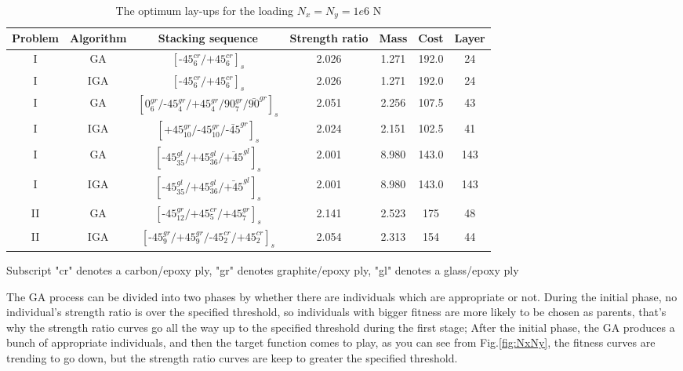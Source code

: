 \documentclass[USenglish]{article}
\begin{document}
\begin{table}
\caption{The optimum lay-ups for the loading $N_x=N_y=1e6$ N}
\begin{tabular}{ccccccc}
	\toprule
	 Problem  &   Algorithm      & Stacking sequence                                    & Strength ratio  & Mass  &  Cost   & Layer    \\ 
	\midrule																								  
	      I   &  GA   &  $[\text{-}45_{6}^{cr}/\text{+}45_{6}^{cr}]_s$                        & 2.026           & 1.271 &  192.0  & 24  \\
	      I   &  IGA   &  $[\text{-}45_{6}^{cr}/\text{+}45_{6}^{cr}]_s$                        & 2.026           & 1.271 &  192.0  & 24  \\
	      I   &  GA    &  $[0_6^{gr}/\text{-}45_{4}^{gr}/\text{+}45_{4}^{gr}/90_{7}^{gr}/\bar{90}^{gr}]_s$     & 2.051           & 2.256 &  107.5  & 43  \\
	      I   &  IGA    &  $[\text{+}45_{10}^{gr}/\text{-}45_{10}^{gr}/\bar{\text{-}45}^{gr}]_s$    & 2.024           & 2.151 &  102.5  & 41  \\
	      I   &  GA    &  $[\text{-}45_{35}^{gl}/\text{+}45_{36}^{gl}/\bar{\text{+}45}^{gl}]_s$    & 2.001           & 8.980 &  143.0  & 143  \\
	      I   &  IGA    &  $[\text{-}45_{35}^{gl}/\text{+}45_{36}^{gl}/\bar{\text{+}45}^{gl}]_s$    & 2.001           & 8.980 &  143.0  & 143  \\
	      II  &  GA    &
	$[\text{-}45_{12}^{gr}/\text{+}45_{5}^{cr}/\text{+}45_{7}^{gr}]_s$         & 2.141
										  & 2.523 & 175& 48  \\
	      II  &  IGA    &
	$[\text{-}45_{9}^{gr}/\text{+}45_{9}^{gr}/\text{-}45_{2}^{cr}/\text{+}45_{2}^{cr}]_s$         & 2.054
										  & 2.313 & 154& 44  \\
	\bottomrule
\end{tabular}
\label{tab:NxNy}
\end{table}
\begin{tablenotes}\footnotesize
\item{Subscript "cr" denotes a carbon/epoxy ply, "gr" denotes graphite/epoxy ply, "gl" denotes a
	glass/epoxy ply}
\end{tablenotes}

  The GA process can be divided into two phases by whether there are individuals which are appropriate
or not. During the initial phase, no individual's strength ratio is over the specified threshold, so
individuals with bigger fitness are more likely to be chosen as parents, that's why the strength
ratio curves go all the way up to the specified threshold during the first stage; After the initial
phase, the GA produces a bunch of appropriate individuals, and then the target function comes to
play, as you can see from Fig.\ref{fig:NxNy}, the fitness curves are trending to go down, but the
strength ratio curves are keep to greater the specified threshold.
\end{document}
